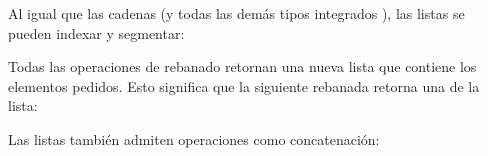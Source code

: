 \documentclass[a4,10pt,spanish]{sphinxmanual}
\begin{document}
\begin{sphinxVerbatim}[commandchars=\\\{\}]
  \PYG{p}{[}    \PYG{p}{]}
\end{sphinxVerbatim}

\sphinxAtStartPar
Al igual que las cadenas (y todas las demás tipos integrados {\hyperref[\detokenize{glossary:term-sequence}]{}}), las listas se pueden indexar y segmentar:

\begin{sphinxVerbatim}[commandchars=\\\{\}]
\PYG{p}{[}\PYG{p}{]}  
\PYG{p}{[}\PYG{p}{]}
\PYG{p}{[}\PYG{p}{]}  
\end{sphinxVerbatim}

\sphinxAtStartPar
Todas las operaciones de rebanado retornan una nueva lista que contiene los elementos pedidos. Esto significa que la siguiente rebanada retorna una  de la lista:

\begin{sphinxVerbatim}[commandchars=\\\{\}]
\PYG{p}{[}\PYG{p}{]}
\end{sphinxVerbatim}

\sphinxAtStartPar
Las listas también admiten operaciones como concatenación:

\begin{sphinxVerbatim}[commandchars=\\\{\}]
  \PYG{p}{[}    \PYG{p}{]}
\end{sphinxVerbatim}
\end{document}
